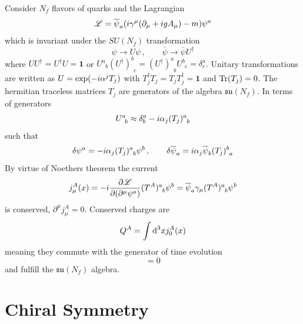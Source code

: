Consider $N_f$ flavors of quarks and the Lagrangian
\begin{equation}
    \mathscr{L}=\overline{\psi}_a({i}\gamma^\mu(\partial_\mu+{i} gA_\mu)-m)\psi^a
\end{equation}
which is invariant under the $SU(N_f)$ transformation
\begin{equation}
    \psi\to U\psi\,,\qquad\overline{\psi}\to\overline{\psi}U^\dagger
\end{equation}
where $UU^\dagger=U^\dagger U=\mathbf{1}$ or $U^a_{\phantom{a}b}(U^\dagger)^b_{\phantom{b}c}=(U^\dagger)^a_{\phantom{a}b}U^b_{\phantom{b}c}=\delta^a_c$. Unitary transformations are written as $U=\exp(-{i} \alpha^jT_j)$ with $T_j^\dagger T_j=T_jT_j^\dagger=\mathbf{1}$ and ${\text{Tr}}(T_j)=0$. The hermitian traceless matrices $T_j$ are generators of the algebra $\mathfrak{su}(N_f)$. In terms of generators
\begin{equation}
    U^a_{\phantom{a}b}\approx\delta^a_b-{i}\alpha_j(T_j)^a_{\phantom{a}b}
\end{equation}
such that
\begin{equation}
    \delta\psi^a=-{i}\alpha_j(T_j)^a_{\phantom{a}b}\psi^b\,,\qquad\delta\overline{\psi}_a={i}\alpha_j\overline{\psi}_b(T_j)^b_{\phantom{b}a}
\end{equation}
By virtue of Noethers theorem the current
\begin{equation}
    j^A_\mu(x)=-{i}\frac{\partial\mathscr{L}}{\partial(\partial^\mu\psi^a)}(T^A)^a_{\phantom{a}b}\psi^b=\overline{\psi}_a\gamma_\mu(T^A)^a_{\phantom{a}b}\psi^b
\end{equation}
is conserved, $\partial^\mu j_\mu^A=0$. Conserved charges are
\begin{equation}
    Q^A=\int\text{d}^3x j_0^A(x)
\end{equation}
meaning they commute with the generator of time evolution
\begin{equation}
    [H,Q^A]=0
\end{equation}
and fulfill the $\mathfrak{su}(N_f)$ algebra.  

\section{Chiral Symmetry}


